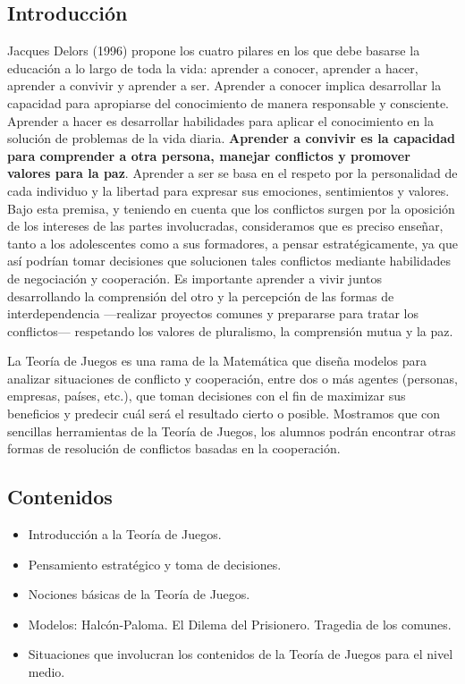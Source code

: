 \subsection{Introducción}

Jacques Delors (1996) propone los cuatro pilares en los que debe basarse la educación a lo largo de toda la vida: aprender a conocer, aprender a hacer, aprender a convivir y aprender a ser. Aprender a conocer implica desarrollar la capacidad para apropiarse del conocimiento de manera responsable y consciente. Aprender a hacer es desarrollar habilidades para aplicar el conocimiento en la solución de problemas de la vida diaria. \textbf{Aprender a convivir es la capacidad para comprender a otra persona, manejar conflictos y promover valores para la paz}. Aprender a ser se basa en el respeto por la personalidad de cada individuo y la libertad para expresar sus emociones, sentimientos y valores. Bajo esta premisa, y teniendo en cuenta que los conflictos surgen por la oposición de los intereses de las partes involucradas, consideramos que es preciso enseñar, tanto a los adolescentes como a sus formadores, a pensar estratégicamente, ya que así podrían tomar decisiones que solucionen tales conflictos mediante habilidades de negociación y cooperación. Es importante aprender a vivir juntos desarrollando la comprensión del otro y la percepción de las formas de interdependencia —realizar proyectos comunes y prepararse para tratar los conflictos— respetando los valores de pluralismo, la comprensión mutua y la paz.

La Teoría de Juegos es una rama de la Matemática que diseña modelos para analizar situaciones de conflicto y cooperación, entre dos o más agentes (personas, empresas, países, etc.), que toman decisiones con el fin de maximizar sus beneficios y predecir cuál será el resultado cierto o posible. Mostramos que con sencillas herramientas de la Teoría de Juegos, los alumnos podrán encontrar otras formas de resolución de conflictos basadas en la cooperación.

\subsection{Contenidos}

\begin{itemize}
	\item Introducción a la Teoría de Juegos.
	\item Pensamiento estratégico y toma de decisiones.
	\item Nociones básicas de la Teoría de Juegos.
	\item Modelos: Halcón-Paloma. El Dilema del Prisionero. Tragedia de los comunes.
	\item Situaciones que involucran los contenidos de la Teoría de Juegos para el nivel medio.
\end{itemize}

